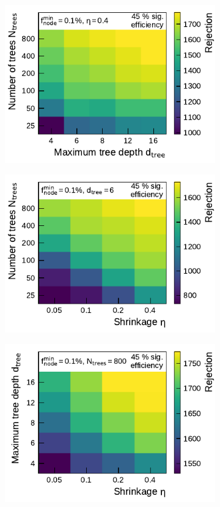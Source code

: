 \begin{figure}[ht]
  \begin{subfigure}[t]{0.48\textwidth}
    \centering
    \includegraphics{./figures/bdt_perf/gridsearch_3p/scan_MaxDepth_NTrees.pdf}
  \end{subfigure}\hfill
  \begin{subfigure}[t]{0.48\textwidth}
    \centering
    \includegraphics{./figures/bdt_perf/gridsearch_3p/scan_Shrinkage_NTrees.pdf}
  \end{subfigure}
  \begin{subfigure}[t]{0.48\textwidth}
    \centering
    \includegraphics{./figures/bdt_perf/gridsearch_3p/scan_Shrinkage_MaxDepth.pdf}

\end{subfigure}
\end{figure}
